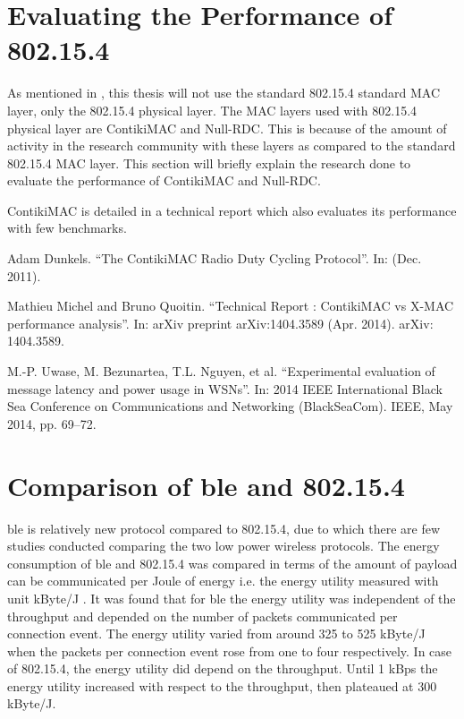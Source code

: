 \section{Evaluating the Performance of 802.15.4} \label{4802}

As mentioned in , this thesis will not use the standard 802.15.4 standard MAC layer, only the 802.15.4 physical layer. The MAC layers used with 802.15.4 physical layer are ContikiMAC and Null-RDC. This is because of the amount of activity in the research community with these layers as compared to the standard 802.15.4 MAC layer. This section will briefly explain the research done to evaluate the performance of ContikiMAC and Null-RDC. 

ContikiMAC is detailed in a technical report \cite{Dunkels2011} which also evaluates its performance with few benchmarks.

\cite{Dunkels2011}
Adam Dunkels. “The ContikiMAC Radio Duty Cycling Protocol”. In: (Dec. 2011).

\cite{Michel2014} Mathieu Michel and Bruno Quoitin. “Technical Report : ContikiMAC vs X-MAC performance analysis”. In: arXiv preprint arXiv:1404.3589 (Apr. 2014). arXiv: 1404.3589.

\cite{Uwase2014} M.-P. Uwase, M. Bezunartea, T.L. Nguyen, et al. “Experimental evaluation of message latency and power usage in WSNs”. In: 2014 IEEE International Black Sea Conference on Communications and Networking (BlackSeaCom). IEEE, May 2014,
pp. 69–72.

\section{Comparison of \gls{ble} and 802.15.4} \label{4ble802}

\gls{ble} is relatively new protocol compared to 802.15.4, due to which there are few studies conducted comparing the two low power wireless protocols. The energy consumption of \gls{ble} and 802.15.4 was compared in terms of the amount of payload can be communicated per Joule of energy i.e. the energy utility measured with unit kByte/J \cite{Siekkinen2012}. It was found that for \gls{ble} the energy utility was independent of the throughput and depended on the number of packets communicated per connection event. The energy utility varied from around 325 to 525 kByte/J when the packets per connection event rose from one to four respectively. In case of 802.15.4, the energy utility did depend on the throughput. Until 1 kBps the energy utility increased with respect to the throughput, then plateaued at 300 kByte/J. 

